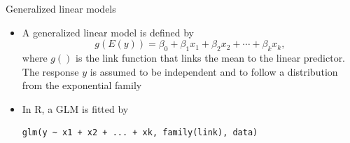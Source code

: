 \documentclass[aspectratio=169]{beamer}
\begin{document}
% 
% 
% 
% 


\begin{frame}[fragile]{Generalized linear models}
  \begin{itemize}
    \item A generalized linear model is defined by
\[
  g(E(y)) = \beta_0 + \beta_1 x_1 + \beta_2 x_2 + \cdots + \beta_k x_k,
\]
where $g()$ is the link function that links the mean to the linear predictor.
The response $y$ is assumed to be independent and to follow a distribution
from the exponential family

\item In R, a GLM is fitted by

  \begin{lstlisting}[style=plain]
  glm(y ~ x1 + x2 + ... + xk, family(link), data)
\end{lstlisting}
  \end{itemize}
\end{frame}
\end{document}

